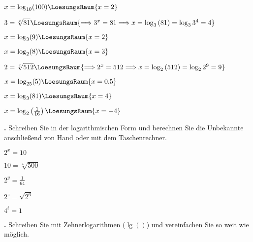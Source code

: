 \begin{bbwAufgabenBlock}
\item $x = \log_{10}(100)  \LoesungsRaum{x=2}$
\item $3 = \sqrt[x]{81}  \LoesungsRaum{\Longrightarrow 3^x=81 \Longrightarrow x=\log_3{}(81) = \log_3{3^4} = 4}$

\item $x = \log_3(9)  \LoesungsRaum{x=2}$

\item $x = \log_2(8)  \LoesungsRaum{x=3}$

\item $2 = \sqrt[x]{512}  \LoesungsRaum{\Longrightarrow 2^x=512 \Longrightarrow x=\log_2{}(512) = \log_2{2^9} = 9}$

\item $x = \log_{25}(5)  \LoesungsRaum{x=0.5}$

\seitenUmbruchImAufgabenteil{}

\item $x = \log_3(81)  \LoesungsRaum{x=4}$

\item $x = \log_2\left(\frac1{16}\right)  \LoesungsRaum{x=-4}$
\end{bbwAufgabenBlock}

\newpage

\textbf{\bbwAufgabenNummer{}.}
Schreiben Sie in der logarithmischen Form und berechnen Sie die
Unbekannte anschließend von Hand oder mit dem Taschenrechner.

\begin{bbwAufgabenBlock}
\item $2^x = 10$   
\item $10=\sqrt[x]{500}$ 

\item $2^y = \frac{1}{64}$   
\item $2^z = \sqrt{2^6}$   
\item $4^t= 1$   
\end{bbwAufgabenBlock}

\newpage

\textbf{\bbwAufgabenNummer{}.}
Schreiben Sie mit Zehnerlogarithmen ($\lg()$) und vereinfachen Sie so weit wie möglich.

